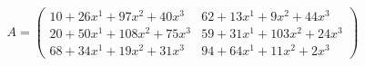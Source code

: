 \documentclass[preview]{standalone}
\begin{document}
\begin{align*}
A = \begin{pmatrix}10 + 26x^{1} + 97x^{2} + 40x^{3} & 62 + 13x^{1} + 9x^{2} + 44x^{3} \\ 20 + 50x^{1} + 108x^{2} + 75x^{3} & 59 + 31x^{1} + 103x^{2} + 24x^{3} \\ 68 + 34x^{1} + 19x^{2} + 31x^{3} & 94 + 64x^{1} + 11x^{2} + 2x^{3}\end{pmatrix}
\end{align*}
\end{document}
